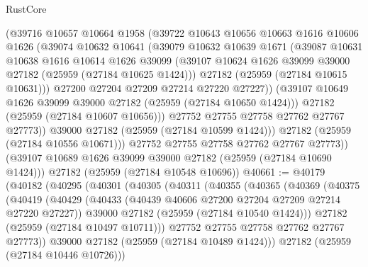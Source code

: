 \begin{lexlean}{RustCore}
\begin{coremodule}
              (@39716
                @10657
                @10664
                @1958
                (@39722
                  @10643
                  @10656
                  @10663
                  @1616
                  @10606
                  @1626
                  (@39074
                    @10632
                    @10641
                    (@39079
                      @10632
                      @10639
                      @1671
                      (@39087
                        @10631
                        @10638
                        @1616
                        @10614
                        @1626
                        @39099
                        (@39107 @10624 @1626 @39099 @39000 @27182 (@25959 (@27184 @10625 @1424)))
                        @27182
                        (@25959 (@27184 @10615 @10631)))
                      @27200
                      @27204
                      @27209
                      @27214
                      @27220
                      @27227))
                  (@39107 @10649 @1626 @39099 @39000 @27182 (@25959 (@27184 @10650 @1424)))
                  @27182
                  (@25959 (@27184 @10607 @10656)))
                @27752
                @27755
                @27758
                @27762
                @27767
                @27773))
            @39000
            @27182
            (@25959 (@27184 @10599 @1424)))
          @27182
          (@25959 (@27184 @10556 @10671)))
        @27752
        @27755
        @27758
        @27762
        @27767
        @27773))
    (@39107 @10689 @1626 @39099 @39000 @27182 (@25959 (@27184 @10690 @1424)))
    @27182
    (@25959 (@27184 @10548 @10696))
@40661 := @40179
    (@40182
      (@40295
        (@40301
          (@40305
            (@40311
              (@40355
                (@40365
                  (@40369
                    (@40375
                      (@40419
                        (@40429
                          (@40433 (@40439 @40606 @27200 @27204 @27209 @27214 @27220 @27227))
                          @39000
                          @27182
                          (@25959 (@27184 @10540 @1424)))
                        @27182
                        (@25959 (@27184 @10497 @10711)))
                      @27752
                      @27755
                      @27758
                      @27762
                      @27767
                      @27773))
                  @39000
                  @27182
                  (@25959 (@27184 @10489 @1424)))
                @27182
                (@25959 (@27184 @10446 @10726)))

\end{coremodule}
\end{lexlean}
